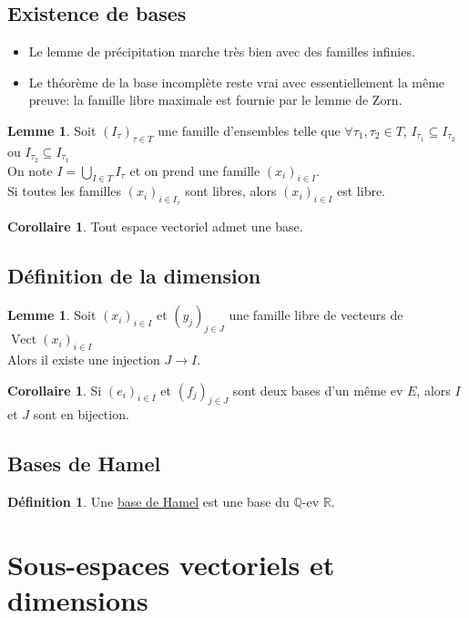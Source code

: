 \documentclass[10pt,a4paper]{article}
\theoremstyle{definition}
\newtheorem{corollaire}[proposition]{Corollaire}
\newtheorem{lemme}[proposition]{Lemme}
\newtheorem{definition}[proposition]{Définition}
\DeclareMathOperator{\vect}{Vect}
\begin{document}
\subsection{Existence de bases}
\begin{itemize}
\item Le lemme de précipitation marche très bien avec des familles infinies.
\item Le théorème de la base incomplète reste vrai avec essentiellement la même preuve: la famille libre maximale est fournie par le lemme de Zorn.
\end{itemize}
\begin{lemme}
Soit $(I_\tau)_{\tau \in T}$ une famille d'ensembles telle que $\forall \tau_1, \tau_2 \in T$, $I_{\tau_1} \subseteq I_{\tau_2}$ ou $I_{\tau_2} \subseteq I_{\tau_1}$ \\
On note $I = \bigcup\limits_{I \in T} I_\tau$ et on prend une famille $(x_i)_{i \in I}$. \\
Si toutes les familles $(x_i)_{i \in I_\tau}$ sont libres, alors $(x_i)_{i \in I}$ est libre.
\end{lemme}
\begin{corollaire}
Tout espace vectoriel admet une base.
\end{corollaire}

\subsection{Définition de la dimension}
\begin{lemme}
Soit $(x_i)_{i \in I}$ et $(y_j)_{j \in J}$ une famille libre de vecteurs de $\vect (x_i)_{i \in I}$ \\
Alors il existe une injection $J \to I$.
\end{lemme}
\begin{corollaire}
Si $(e_i)_{i \in I}$ et $(f_j)_{j \in J}$ sont deux bases d'un même ev $E$, alors $I$ et $J$ sont en bijection.
\end{corollaire}

\subsection{Bases de Hamel}
\begin{definition}
Une \uline{base de Hamel} est une base du $\mathbb{Q}$-ev $\mathbb{R}$.
\end{definition}

\section{Sous-espaces vectoriels et dimensions}
\end{document}
